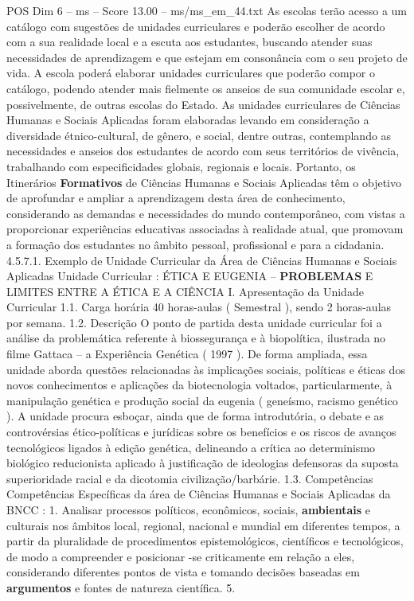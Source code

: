 \begin{textsample}{POS Dim 6 – ms – Score 13.00 – ms/ms\_em\_44.txt}
As escolas terão acesso a um catálogo com sugestões de unidades curriculares e poderão escolher de acordo com a sua realidade local e a escuta aos estudantes, buscando atender suas necessidades de aprendizagem e que estejam em consonância com o seu projeto de vida.
A escola poderá elaborar unidades curriculares que poderão compor o catálogo, podendo atender mais fielmente os anseios de sua comunidade escolar e, possivelmente, de outras escolas do Estado.
As unidades curriculares de Ciências Humanas e Sociais Aplicadas foram elaboradas levando em consideração a diversidade étnico-cultural, de gênero, e social, dentre outras, contemplando as necessidades e anseios dos estudantes de acordo com seus territórios de vivência, trabalhando com especificidades globais, regionais e locais.
Portanto, os Itinerários \textbf{Formativos} de Ciências Humanas e Sociais Aplicadas têm o objetivo de aprofundar e ampliar a aprendizagem desta área de conhecimento, considerando as demandas e necessidades do mundo contemporâneo, com vistas a proporcionar experiências educativas associadas à realidade atual, que promovam a formação dos estudantes no âmbito pessoal, profissional e para a cidadania. 4.5.7.1.
Exemplo de Unidade Curricular da Área de Ciências Humanas e Sociais Aplicadas Unidade Curricular : ÉTICA E EUGENIA – \textbf{PROBLEMAS} E LIMITES ENTRE A ÉTICA E A CIÊNCIA I.
Apresentação da Unidade Curricular 1.1.
Carga horária 40 horas-aulas ( Semestral ), sendo 2 horas-aulas por semana. 1.2.
Descrição O ponto de partida desta unidade curricular foi a análise da problemática referente à biossegurança e à biopolítica, ilustrada no filme Gattaca – a Experiência Genética ( 1997 ).
De forma ampliada, essa unidade aborda questões relacionadas às implicações sociais, políticas e éticas dos novos conhecimentos e aplicações da biotecnologia voltados, particularmente, à manipulação genética e produção social da eugenia ( geneísmo, racismo genético ).
A unidade procura esboçar, ainda que de forma introdutória, o debate e as controvérsias ético-políticas e jurídicas sobre os benefícios e os riscos de avanços tecnológicos ligados à edição genética, delineando a crítica ao determinismo biológico reducionista aplicado à justificação de ideologias defensoras da suposta superioridade racial e da dicotomia civilização/barbárie. 1.3.
Competências Competências Específicas da área de Ciências Humanas e Sociais Aplicadas da BNCC : 1.
Analisar processos políticos, econômicos, sociais, \textbf{ambientais} e culturais nos âmbitos local, regional, nacional e mundial em diferentes tempos, a partir da pluralidade de procedimentos epistemológicos, científicos e tecnológicos, de modo a compreender e posicionar -se criticamente em relação a eles, considerando diferentes pontos de vista e tomando decisões baseadas em \textbf{argumentos} e fontes de natureza científica. 5.

\end{textsample}
